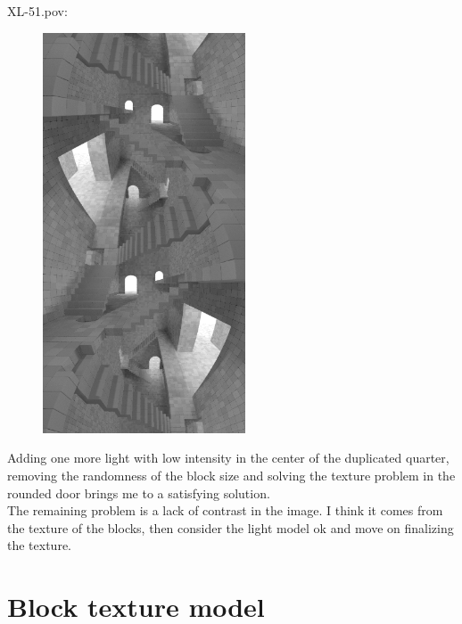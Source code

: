 \documentclass[12pt, a4paper]{article}
\begin{document}
XL-51.pov:\\
\begin{scriptsize}
\begin{ttfamily}

\end{ttfamily}
\end{scriptsize}

\begin{center}
\begin{figure}[H]
\centering
\includegraphics[width=6cm]{./XL-51_15.png}\\
\end{figure}
\end{center}

Adding one more light with low intensity in the center of the duplicated quarter, removing the randomness of the block size and solving the texture problem in the rounded door brings me to a satisfying solution.\\

The remaining problem is a lack of contrast in the image. I think it comes from the texture of the blocks, then consider the light model ok and move on finalizing the texture.\\

\section{Block texture model}
\end{document}
